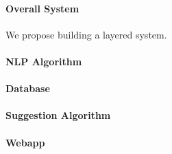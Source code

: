\paragraph{Overall System}
We propose building a layered system.


\paragraph{NLP Algorithm}

\paragraph{Database}

\paragraph{Suggestion Algorithm}

\paragraph{Webapp}

